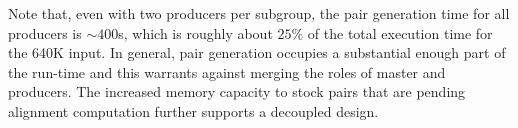 \documentclass[10pt,journal,letterpaper,compsoc]{IEEEtran}
\begin{document}
Note that, even with two producers per subgroup, the pair generation time for all producers is $\sim$$400$s, which is roughly about $25\%$ of the total execution time for the 640K input. In general, pair generation occupies a substantial enough part of the run-time and this  warrants against merging the roles of master and producers. The increased memory capacity to stock pairs that are pending alignment computation further supports a decoupled design.

\begin{comment}
{\it Andy: I have assumed here that the fraction of the total time (400s) that a producer is idle is negligible. Is this right? On a related note, I can't understand the following: If the idle time for producers during pair generation is negligible AND since there are two producers per subgroup, it implies that almost $50\%$ of the alignment time is pair generation time. Since there are 13 consumers per subgroup, this implies a ratio of 1:26 for pair gen time: pair alignment time. This seems contradicting to our 1:7 assumption. Can you clarify? Does your 1:7 ratio account for time to communicate and if so, as part of which (align or gen)?}
\end{comment}
\end{document}
